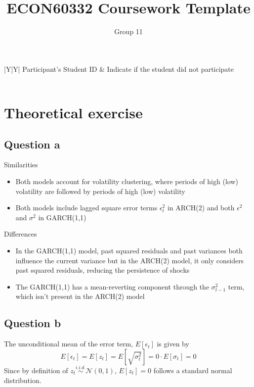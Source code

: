 \documentclass{article}
\title{ECON60332 Coursework Template}
\author{Group 11} %
\date{}
\begin{document}
\maketitle

\noindent\begin{tabularx}{\linewidth}{|Y|Y|}
    \hline
     Participant’s Student ID & Indicate if the student did not participate \\
    \hline
    \\
    \hline

\end{tabularx}

\section*{Theoretical exercise}

\subsection*{Question a}

Similarities 
\begin{itemize}
	\item Both models account for volatility clustering, where periods of high (low) volatility are followed by periods of high (low) volatility 
		\item Both models include lagged square error terms $\epsilon^2_{t}$ in ARCH(2) and both $\epsilon^2$ and $\sigma^2$ in GARCH(1,1) 
\end{itemize}

Differences
\begin{itemize}
	\item In the GARCH(1,1) model, past squared residuals and past variances both influence the current variance but in the ARCH(2) model, it only considers past squared residuals,  reducing the persistence of shocks
	\item The GARCH(1,1) has a mean-reverting component through the $\sigma^2_{t-1}$ term, which isn't present in the ARCH(2) model 
\end{itemize}

\subsection*{Question b}

The unconditional mean of the error term, $E \left[ \epsilon_t \right]$ is given by
\[
	E \left[ \epsilon_t \right] = E \left[ z_{t}  \right] = E \left[ \sqrt{\sigma_t^2}   \right]   = 0 \cdot E \left[ \sigma_t \right] = 0
\]
Since by definition of $z_t \stackrel{i . i . d .}{\sim} \mathcal{N}(0,1)$, $E \left[ z_{t} \right] =0$ follows a standard normal distribution. 
\end{document}
